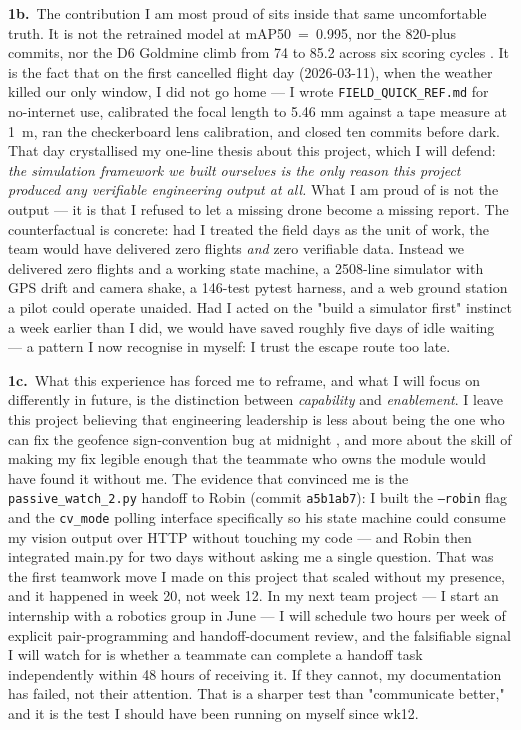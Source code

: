 \textbf{1b.}~The contribution I am most proud of sits inside that same uncomfortable truth. It is not the retrained model at mAP50~=~0.995, nor the 820-plus commits, nor the D6 Goldmine climb from 74 to 85.2 across six scoring cycles \cite{Moon2004}. It is the fact that on the first cancelled flight day (2026-03-11), when the weather killed our only window, I did not go home --- I wrote \texttt{FIELD\_QUICK\_REF.md} for no-internet use, calibrated the focal length to 5.46 mm against a tape measure at 1~m, ran the checkerboard lens calibration, and closed ten commits before dark. That day crystallised my one-line thesis about this project, which I will defend: \emph{the simulation framework we built ourselves is the only reason this project produced any verifiable engineering output at all.} What I am proud of is not the output --- it is that I refused to let a missing drone become a missing report. The counterfactual is concrete: had I treated the field days as the unit of work, the team would have delivered zero flights \emph{and} zero verifiable data. Instead we delivered zero flights and a working state machine, a 2508-line simulator with GPS drift and camera shake, a 146-test pytest harness, and a web ground station a pilot could operate unaided. Had I acted on the "build a simulator first" instinct a week earlier than I did, we would have saved roughly five days of idle waiting --- a pattern I now recognise in myself: I trust the escape route too late.

\textbf{1c.}~What this experience has forced me to reframe, and what I will focus on differently in future, is the distinction between \emph{capability} and \emph{enablement}. I leave this project believing that engineering leadership is less about being the one who can fix the geofence sign-convention bug at midnight \cite{Schon1983}, and more about the skill of making my fix legible enough that the teammate who owns the module would have found it without me. The evidence that convinced me is the \texttt{passive\_watch\_2.py} handoff to Robin (commit \texttt{a5b1ab7}): I built the \texttt{--robin} flag and the \texttt{cv\_mode} polling interface specifically so his state machine could consume my vision output over HTTP without touching my code --- and Robin then integrated main.py for two days without asking me a single question. That was the first teamwork move I made on this project that scaled without my presence, and it happened in week 20, not week 12. In my next team project --- I start an internship with a robotics group in June --- I will schedule two hours per week of explicit pair-programming and handoff-document review, and the falsifiable signal I will watch for is whether a teammate can complete a handoff task independently within 48 hours of receiving it. If they cannot, my documentation has failed, not their attention. That is a sharper test than "communicate better," and it is the test I should have been running on myself since wk12.

